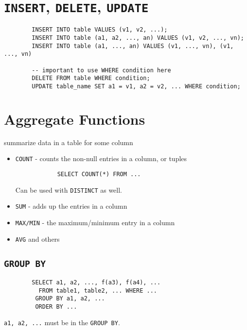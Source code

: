 \documentclass{../cheatsheet}
\begin{document}
\begin{multicols*}{2}
    \section{\texttt{INSERT}, \texttt{DELETE}, \texttt{UPDATE}}
    \begin{verbatim}
        INSERT INTO table VALUES (v1, v2, ...);
        INSERT INTO table (a1, a2, ..., an) VALUES (v1, v2, ..., vn);
        INSERT INTO table (a1, ..., an) VALUES (v1, ..., vn), (v1, ..., vn)

        -- important to use WHERE condition here
        DELETE FROM table WHERE condition;
        UPDATE table_name SET a1 = v1, a2 = v2, ... WHERE condition;
    \end{verbatim}

    \newpage
    \section{Aggregate Functions}
    summarize data in a table for some column
    \begin{itemize}
        \item \texttt{COUNT} - counts the non-null entries in a column, or tuples
            \begin{verbatim}
            SELECT COUNT(*) FROM ...
            \end{verbatim}

            Can be used with \texttt{DISTINCT} as well.

        \item \texttt{SUM} - adds up the entries in a column

        \item \texttt{MAX/MIN} - the maximum/minimum entry in a column

        \item \texttt{AVG} and others
    \end{itemize}

    \subsection{\texttt{GROUP BY}}
    \begin{verbatim}
        SELECT a1, a2, ..., f(a3), f(a4), ...
          FROM table1, table2, ... WHERE ...
         GROUP BY a1, a2, ...
         ORDER BY ...
    \end{verbatim}

    \texttt{a1, a2, ...} must be in the \texttt{GROUP BY}.


\end{multicols*}
\end{document}
